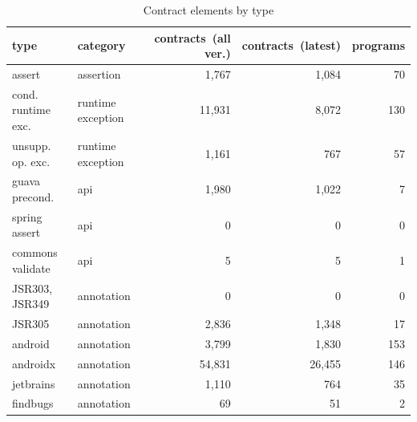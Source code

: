 \begin{table}[]
\centering
\caption{Contract elements by type}
\label{tab:contractsbytype}
\begin{tabular}{|p{5cm}|p{3cm}|r|r|r|} \hline
   type & category & \parbox{1.2cm}{contracts\ (all ver.)}  & \parbox{1.2cm}{contracts\ (latest)} & pro\-grams \\ \hline
	assert &  assertion &  1,767 &  1,084 &  70 \\ 
	cond. runtime exc. &  runtime exception &  11,931 &  8,072 &  130 \\ 
	unsupp. op. exc. &  runtime exception &  1,161 &  767 &  57 \\ 
	guava precond. &  api &  1,980 &  1,022 &  7 \\ 
	spring assert &  api &  0 &  0 &  0 \\ 
	commons validate &  api &  5 &  5 &  1 \\ 
	JSR303, JSR349 &  annotation &  0 &  0 &  0 \\ 
	JSR305 &  annotation &  2,836 &  1,348 &  17 \\ 
	android &  annotation &  3,799 &  1,830 &  153 \\ 
	androidx &  annotation &  54,831 &  26,455 &  146 \\ 
	jetbrains &  annotation &  1,110 &  764 &  35 \\ 
	findbugs &  annotation &  69 &  51 &  2 \\ 
\hline
\end{tabular}
\end{table}
